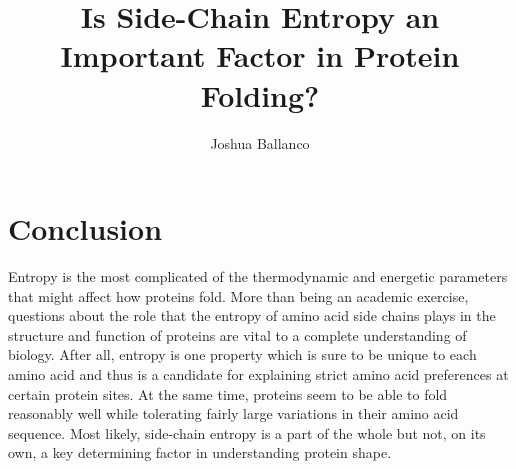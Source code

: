 \documentclass[]{article}
\title{Is Side-Chain Entropy an Important Factor in Protein Folding?}
\author{Joshua Ballanco}
\begin{document}
\maketitle

\begin{abstract}

\end{abstract}

\newpage



 


\section{Conclusion} %
\label{sec:conclusion}
Entropy is the most complicated of the thermodynamic and energetic parameters that might affect how proteins fold. More than being an academic exercise, questions about the role that the entropy of amino acid side chains plays in the structure and function of proteins are vital to a complete understanding of biology. After all, entropy is one property which is sure to be unique to each amino acid and thus is a candidate for explaining strict amino acid preferences at certain protein sites. At the same time, proteins seem to be able to fold reasonably well while tolerating fairly large variations in their amino acid sequence. Most likely, side-chain entropy is a part of the whole but not, on its own, a key determining factor in understanding protein shape.

{}

\end{document}

